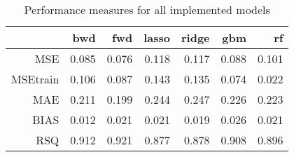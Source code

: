 \begin{table}[H]
\centering
\begin{tabular}{rrrrrrr}
  \hline
 & bwd & fwd & lasso & ridge & gbm & rf \\ 
  \hline
MSE & 0.085 & 0.076 & 0.118 & 0.117 & 0.088 & 0.101 \\ 
  MSEtrain & 0.106 & 0.087 & 0.143 & 0.135 & 0.074 & 0.022 \\ 
  MAE & 0.211 & 0.199 & 0.244 & 0.247 & 0.226 & 0.223 \\ 
  BIAS & 0.012 & 0.021 & 0.021 & 0.019 & 0.026 & 0.021 \\ 
  RSQ & 0.912 & 0.921 & 0.877 & 0.878 & 0.908 & 0.896 \\ 
   \hline
\end{tabular}
\caption{Performance measures for all implemented models} 
\label{tab:measures}
\end{table}
